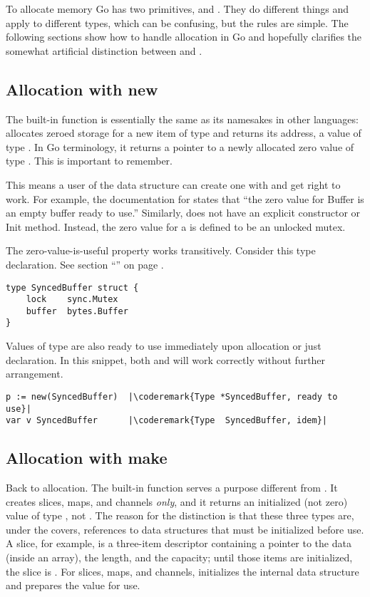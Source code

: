 To allocate memory Go has two primitives,  and . They do different
things and apply to different types, which can be confusing, but the
rules are simple.
The following sections show how to handle allocation
in Go and hopefully clarifies the somewhat artificial distinction between
 and . 

\subsection{Allocation with new}
\label{sec:allocation with new}
The built-in function  is 
essentially the same as its namesakes in other languages: 
allocates zeroed storage for a new item of type  and returns its
address, a value of type . In Go terminology, it returns a pointer to
a newly allocated zero value of type . This is important to
remember.

This
means a user of the data structure can create one with  and get
right to work. For example, the documentation for  states
that ``the zero value for Buffer is an empty buffer ready to use.''
Similarly,  does not have an explicit constructor or Init
method. Instead, the zero value for a  is defined to be an
unlocked mutex.

The zero-value-is-useful property works transitively. Consider this type
declaration. See section ``'' on page
\pageref{sec:defining your own}.

\begin{lstlisting}
type SyncedBuffer struct {
    lock    sync.Mutex
    buffer  bytes.Buffer
}
\end{lstlisting}
Values of type  are also ready to use immediately upon
allocation or just declaration. In this snippet, both  and
 will work
correctly without further arrangement.
\begin{lstlisting}
p := new(SyncedBuffer)  |\coderemark{Type *SyncedBuffer, ready to use}|
var v SyncedBuffer      |\coderemark{Type  SyncedBuffer, idem}|
\end{lstlisting}

\subsection{Allocation with make}
\label{sec:allocation with make}
Back to allocation. The built-in function  serves a purpose
different from . It creates slices, maps, and channels \emph{only}, and
it returns an initialized (not zero) value of type , not
. The reason
for the distinction is that these three types are, under the covers,
references to data structures that must be initialized before use. A
slice, for example, is a three-item descriptor containing a pointer to
the data (inside an array), the length, and the capacity; until those
items are initialized, the slice is . For slices, maps, and channels,
 initializes the internal data structure and prepares the value for
use.

